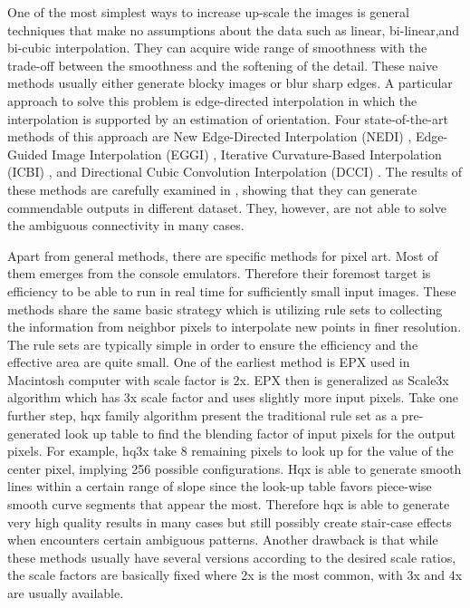 \documentclass{article}
\begin{document}
One of the most simplest ways to increase up-scale the images is general techniques that make no assumptions about the data such as linear, bi-linear,and bi-cubic interpolation. They can acquire wide range of smoothness with the trade-off between the smoothness and the softening of the detail. These naive methods usually either generate blocky images or blur sharp edges. A particular approach to solve this problem is edge-directed  interpolation in which the interpolation is supported by an estimation of orientation. Four state-of-the-art methods of this approach are New Edge-Directed Interpolation (NEDI) \cite{Li01newedge}, Edge-Guided Image Interpolation (EGGI) \cite{ZhangW06a}, Iterative Curvature-Based Interpolation (ICBI) \cite{Iterative}, and Directional Cubic Convolution Interpolation (DCCI) \cite{imageinterpolation}. The results of these methods are carefully examined in \cite{journals/corr/abs-1303-6455}, showing that they can generate commendable outputs in different dataset. They, however, are not able to solve the ambiguous connectivity in many cases.

Apart from general methods, there are specific methods \cite{EPX,HQX} for pixel art. Most of them emerges from the console emulators. Therefore their foremost target is efficiency to be able to run in real time for sufficiently small input images. These methods share the same basic strategy which is utilizing rule sets to collecting the information from neighbor pixels to interpolate new points in finer resolution. The rule sets are typically simple in order to ensure the efficiency and the effective area are quite small. One of the earliest method is EPX  \cite{EPX}  used in Macintosh computer with scale factor is 2x. EPX then is generalized as Scale3x algorithm which has 3x scale factor and uses slightly more input pixels. Take one further step, hqx \cite{HQX} family algorithm present the traditional rule set as a pre-generated look up table to find the blending factor of input pixels for the output pixels. For example, hq3x take 8 remaining pixels to look up for the value of the center pixel, implying 256 possible configurations. Hqx is able to generate smooth lines within a certain range of slope since the look-up table favors piece-wise smooth curve segments that appear the most. Therefore hqx is able to generate very high quality results in many cases but still possibly create stair-case effects when encounters certain ambiguous patterns. Another drawback is that while these methods usually have several versions according to the desired scale ratios, the scale factors are basically fixed where 2x is the most common, with 3x and 4x are usually available.
\end{document}
